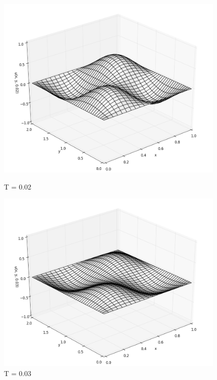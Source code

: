 \documentclass[12pt]{article}
\begin{document}
\begin{figure}[h!]
\begin{minipage}[h]{0.5\linewidth}
				\includegraphics[width=\linewidth]{solution_t02}
				\caption{T = 0.02}
			\end{minipage}
			\hfill
			\begin{minipage}[h]{0.5\linewidth}
				\includegraphics[width=\linewidth]{solution_t03}
				\caption{T = 0.03}
			\end{minipage}
			\vfill
			\begin{minipage}[h]{0.5\linewidth}

\end{minipage}
\end{figure}
\end{document}
